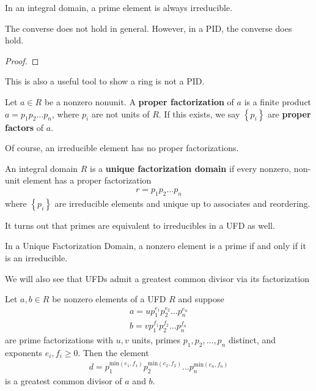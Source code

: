 \documentclass{memoir}
\begin{document}
\begin{prop}
	In an integral domain, a prime element is always irreducible.
\end{prop}
The converse does not hold in general. However, in a PID, the converse does hold.

\begin{proof}%
	
\end{proof}
This is also a useful tool to show a ring is not a PID.

\begin{defn}
	Let \(a \in R\) be a nonzero nonunit. A \textbf{proper factorization} of \(a\) is a finite product \(a=p_1p_2\ldots p_n\), where \(p_i\) are not units of \(R\). If this exists, we say \(\left\{ p_i \right\} \) are \textbf{proper factors} of \(a\).
\end{defn}
Of course, an irreducible element has no proper factorizations.

\begin{defn}
	An integral domain \(R\) is a \textbf{unique factorization domain} if every nonzero, non-unit element has a proper factorization
	\begin{align*}
		r = p_1p_2\ldots p_n
	\end{align*}
	where \(\left\{ p_i \right\} \) are irreducible elements and unique up to associates and reordering.
\end{defn}
It turns out that primes are equivalent to irreducibles in a UFD as well.

\begin{prop}
	In a Unique Factorization Domain, a nonzero element is a prime if and only if it is an irreducible.
\end{prop}
We will also see that UFDs admit a greatest common divisor via its factorization

\begin{prop}
	Let \(a,b \in R\) be nonzero elements of a UFD \(R\) and suppose
	\begin{align*}
		a = up_1^{e_1}p_2^{e_2}\ldots p_n^{e_n}\\
		b= v p_1^{f_1}p_2^{f_2}\ldots p_n^{f_n}
	\end{align*}
	are prime factorizations with \(u,v\) units, primes \(p_1,p_2,\ldots,p_n\) distinct, and exponents \(e_i,f_i \geq 0\). Then the element
	\begin{align*}
		d = p_1^{\textrm{min}(e_1,f_1)}p_2^{\textrm{min}(e_2,f_2)}\ldots p_n^{\textrm{min}(e_n,f_n)}
	\end{align*}
	is a greatest common divisor of \(a\) and \(b\).
\end{prop}
\end{document}
